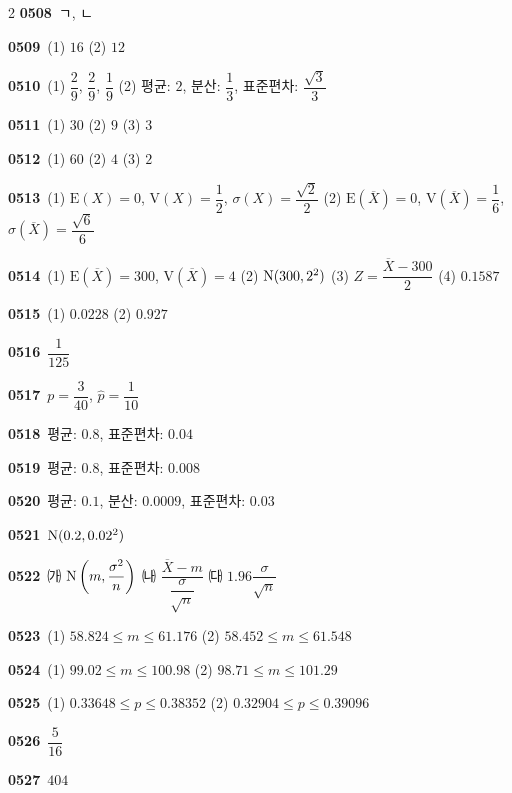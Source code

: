 \documentclass[10pt,a4paper]{article}
\begin{document}
\begin{multicols}{2}
\noindent\textbf{0508}\ ㄱ, ㄴ\par
\noindent\textbf{0509}\ (1) $16$ \quad (2) $12$\par
\noindent\textbf{0510}\ (1) $\dfrac{2}{9}$, $\dfrac{2}{9}$, $\dfrac{1}{9}$ \quad (2) 평균: $2$, 분산: $\dfrac{1}{3}$, 표준편차: $\dfrac{\sqrt{3}}{3}$\par
\noindent\textbf{0511}\ (1) $30$ \quad (2) $9$ \quad (3) $3$\par
\noindent\textbf{0512}\ (1) $60$ \quad (2) $4$ \quad (3) $2$\par
\noindent\textbf{0513}\ (1) $\mathrm{E}(X)=0$, $\mathrm{V}(X)=\dfrac{1}{2}$, $\sigma(X)=\dfrac{\sqrt{2}}{2}$ \quad (2) $\mathrm{E}(\overline{X})=0$, $\mathrm{V}(\overline{X})=\dfrac{1}{6}$, $\sigma(\overline{X})=\dfrac{\sqrt{6}}{6}$\par
\noindent\textbf{0514}\ (1) $\mathrm{E}(\overline{X})=300$, $\mathrm{V}(\overline{X})=4$ \quad (2) $\mathrm{N}(300{,}\mkern3mu\mathopen{}2^2)$ \quad (3) $Z=\dfrac{\overline{X}-300}{2}$ \quad (4) $0.1587$\par
\noindent\textbf{0515}\ (1) $0.0228$ \quad (2) $0.927$\par
\noindent\textbf{0516}\ $\dfrac{1}{125}$\par
\noindent\textbf{0517}\ $p=\dfrac{3}{40}$, $\hat{p}=\dfrac{1}{10}$\par
\noindent\textbf{0518}\ 평균: $0.8$, 표준편차: $0.04$\par
\noindent\textbf{0519}\ 평균: $0.8$, 표준편차: $0.008$\par
\noindent\textbf{0520}\ 평균: $0.1$, 분산: $0.0009$, 표준편차: $0.03$\par
\noindent\textbf{0521}\ $\mathrm{N}(0.2{,}\mkern3mu\mathopen{}0.02^2)$\par
\noindent\textbf{0522}\ ㈎ $\mathrm{N}\left(m{,}\mkern3mu\mathopen{}\dfrac{\sigma^2}{n}\right)$ \quad ㈏ $\dfrac{\overline{X}-m}{\dfrac{\sigma}{\sqrt{n}}}$ \quad ㈐ $1.96\dfrac{\sigma}{\sqrt{n}}$\par
\noindent\textbf{0523}\ (1) $58.824\le m\le 61.176$ \quad (2) $58.452\le m\le 61.548$\par
\noindent\textbf{0524}\ (1) $99.02\le m\le 100.98$ \quad (2) $98.71\le m\le 101.29$\par
\noindent\textbf{0525}\ (1) $0.33648\le p\le 0.38352$ \quad (2) $0.32904\le p\le 0.39096$\par
\noindent\textbf{0526}\ $\dfrac{5}{16}$\par
\noindent\textbf{0527}\ $404$\par

\end{multicols}
\end{document}
